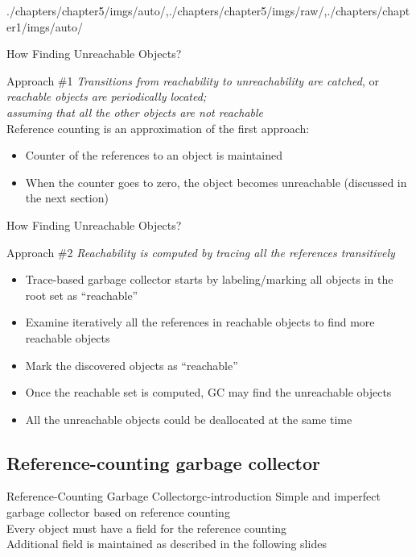 \begin{graphicspathcontext}{{./chapters/chapter5/imgs/auto/},{./chapters/chapter5/imgs/raw/},{./chapters/chapter1/imgs/auto/}}
\begin{bibunit}[apalike]
\begin{frame}{{How Finding} Unreachable Objects?}
	\begin{block}{Approach \#1}
		\emph{Transitions from reachability to unreachability are catched}, or \\
		\emph{reachable objects are periodically located;} \\
		\emph{assuming that all the other objects are not reachable} \\[.5cm]
		Reference counting is an approximation of the first approach:
		\begin{itemize}
			\item Counter of the references to an object is maintained
			\item When the counter goes to zero, the object becomes unreachable (discussed in the next section)
		\end{itemize}
	\end{block}
\end{frame}

\begin{frame}{{How Finding} Unreachable Objects? \insertcontinuationtext}
	\begin{block}{Approach \#2}
		\emph{Reachability is computed by tracing all the references transitively} \\[.5cm]
		\begin{itemize}
			\item Trace-based garbage collector starts by labeling/marking all objects in the root set as ``reachable''
			\item Examine iteratively all the references in reachable objects to find more reachable objects
			\item Mark the discovered objects as ``reachable''
			\item Once the reachable set is computed, GC may find the unreachable objects
			\item All the unreachable objects could be deallocated at the same time
		\end{itemize}
	\end{block}
\end{frame}

\subsection{Reference-counting garbage collector}
\subsectiontableofcontentslide

\begin{leftlawnframe}{Reference-Counting Garbage Collector}{gc-introduction}
	Simple and imperfect garbage collector based on reference counting \\[1cm]
	Every object must have a field for the reference counting \\
	Additional field is maintained as described in the following slides
\end{leftlawnframe}


\end{bibunit}
\end{graphicspathcontext}
